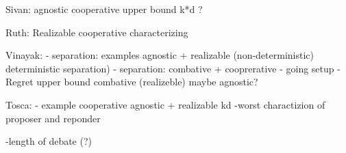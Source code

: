 Sivan: agnostic cooperative upper bound k*d ?

Ruth: Realizable cooperative characterizing

Vinayak:
- separation: examples agnostic + realizable (non-deterministic) deterministic separation)
- separation: combative + cooprerative
- going setup
-Regret upper bound combative (realizeble) maybe agnostic?


Tosca:
- example cooperative agnostic + realizable kd
-worst charactizion of proposer and reponder

-length of debate (?)
